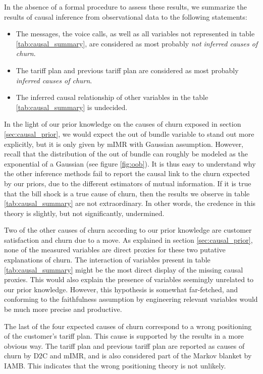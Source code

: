 In the absence of a formal procedure to assess these results, we summarize the
results of causal inference from observational data to the following statements:

\begin{itemize}
    \item The  messages, the voice calls, as well as all variables not
    represented in table \ref{tab:causal_summary}, are considered as most
    probably \emph{not inferred causes of churn}.
    \item The tariff plan and previous tariff plan are considered as most
    probably \emph{inferred causes of churn}.
    \item The inferred causal relationship of other variables in the table
    \ref{tab:causal_summary} is undecided.
\end{itemize}

In the light of our prior knowledge on the causes of churn exposed in section
\ref{sec:causal_prior}, we would expect the out of bundle variable to stand out
more explicitly, but it is only given by mIMR with Gaussian assumption. However,
recall that the distribution of the out of bundle can roughly be modeled as the
exponential of a Gaussian (see figure \ref{fig:oob}). It is thus easy to
understand why the other inference methods fail to report the causal link to the
churn expected by our priors, due to the different estimators of mutual
information. If it is true that the bill shock is a true cause of churn, then
the results we observe in table \ref{tab:causal_summary} are not extraordinary.
In other words, the credence in this theory is slightly, but not significantly,
undermined.

Two of the other causes of churn according to our prior knowledge are customer
satisfaction and churn due to a move. As explained in section
\ref{sec:causal_prior}, none of the measured variables are direct proxies for
these two putative explanations of churn. The interaction of variables present
in table \ref{tab:causal_summary} might be the most direct display of the
missing causal proxies. This would also explain the presence of variables
seemingly unrelated to our prior knowledge. However, this hypothesis is somewhat
far-fetched, and conforming to the faithfulness assumption by engineering
relevant variables would be much more precise and productive.

The last of the four expected causes of churn correspond to a wrong positioning
of the customer's tariff plan. This cause is supported by the results in a more
obvious way. The tariff plan and previous tariff plan are reported as causes of
churn by D2C and mIMR, and is also considered part of the Markov blanket by
IAMB. This indicates that the wrong positioning theory is not unlikely.
